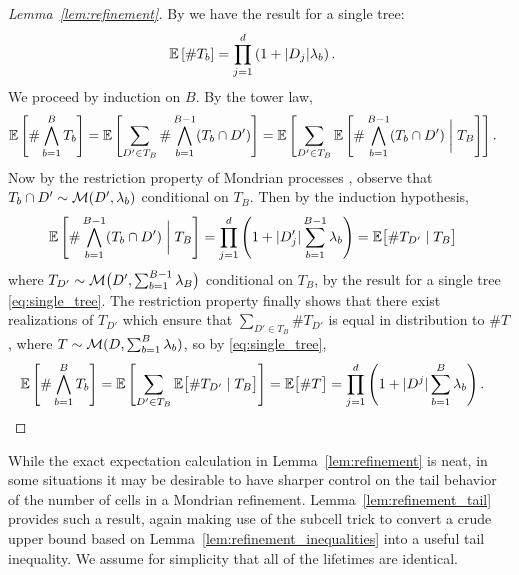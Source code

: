 \begin{proof}[Lemma~\ref{lem:refinement}]

  By \citet[Proposition~2]{mourtada2020minimax}
  we have the result for a single tree:
  \begin{align}
    \label{eq:single_tree}
    \mathbb{E}\left[\# T_b \right]
    &= \prod_{j=1}^d \left(
      1 + |D_j| \lambda_b
    \right).
  \end{align}
  We proceed by induction on $B$.
  By the tower law,
  \begin{align*}
    \mathbb{E}\left[\# \bigwedge_{b=1}^B T_b \right]
    &=
    \mathbb{E}\left[
      \sum_{D' \in T_B}
      \#
      \bigwedge_{b=1}^{B-1} (T_b \cap D')
    \right]
    = \mathbb{E}\left[
      \sum_{D' \in T_B}
      \mathbb{E}\left[
        \#
        \bigwedge_{b=1}^{B-1} (T_b \cap D')
        \biggm| T_B
      \right]
    \right].
  \end{align*}
  Now by the restriction property of Mondrian processes
  \citep[Fact~2]{mourtada2020minimax},
  observe that $T_b \cap D' \sim \mathcal{M}(D', \lambda_b)$
  conditional on $T_B$.
  Then by the induction hypothesis,
  \begin{align*}
    \mathbb{E}\left[
      \#
      \bigwedge_{b=1}^{B-1} (T_b \cap D')
      \biggm| T_B
    \right]
    &=
    \prod_{j=1}^d \left(
      1 + |D'_j| \sum_{b=1}^{B-1} \lambda_b
    \right)
    = \mathbb{E}\big[
      \# T_{D'} \mid T_B
    \big]
  \end{align*}
  where $T_{D'} \sim \mathcal{M}\big(D', \sum_{b=1}^{B-1} \lambda_B\big)$
  conditional on $T_B$,
  by the result for a single tree \eqref{eq:single_tree}.
  The restriction property finally shows that there exist realizations
  of $T_{D'}$ which ensure that
  $\sum_{D' \in T_B} \# T_{D'}$ is equal in distribution
  to $\# T$, where $T \sim \mathcal{M}(D, \sum_{b=1}^B \lambda_b)$,
  so by \eqref{eq:single_tree},
  \begin{align*}
    \mathbb{E}\left[\# \bigwedge_{b=1}^B T_b \right]
    &=
    \mathbb{E}\left[
      \sum_{D' \in T_B}
      \mathbb{E}\big[
        \# T_{D'} \mid T_B
      \big]
    \right]
    =
    \mathbb{E}\big[\# T \big]
    = \prod_{j=1}^d \left(
      1 + |D^j| \sum_{b=1}^B \lambda_b
    \right).
  \end{align*}
\end{proof}

While the exact expectation calculation in Lemma~\ref{lem:refinement} is neat,
in some situations it may be desirable to have sharper control on the tail
behavior of the number of cells in a Mondrian refinement.
Lemma~\ref{lem:refinement_tail} provides such a result, again making
use of the subcell trick to convert a crude upper bound based on
Lemma~\ref{lem:refinement_inequalities} into a useful tail inequality.
We assume for simplicity that all of the lifetimes are identical.

